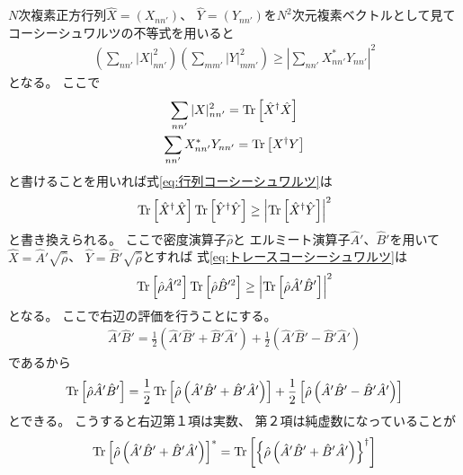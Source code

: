 \documentclass[a4paper, 10pt, uplatex]{jsarticle}
\begin{document}
\begin{problem}
	$N$次複素正方行列$\hat{X} = (X_{nn'})$、
	$\hat{Y} = (Y_{nn'})$を$N^2$次元複素ベクトルとして見て
	コーシーシュワルツの不等式を用いると
	\begin{align}
		\left( \sum_{nn'} |X|^2_{nn'} \right)
		\left( \sum_{mm'} |Y|^2_{mm'} \right)
		\geq \left| \sum_{nn'} X^*_{nn'} Y_{nn'} \right|^2
		\label{eq:行列コーシーシュワルツ}
	\end{align}
	となる。
	ここで
	\begin{gather}
		\sum_{nn'} |X|^2_{nn'}
		= \operatorname*{Tr} \left[ \hat{X}^\dagger \hat{X} \right] \\
		\sum_{nn'} X^*_{nn'} Y_{nn'}
		= \operatorname*{Tr} \left[ X^\dagger Y \right]
	\end{gather}
	と書けることを用いれば式\eqref{eq:行列コーシーシュワルツ}は
	\begin{align}
		\operatorname*{Tr} \left[ \hat{X}^\dagger \hat{X} \right]
		\operatorname*{Tr} \left[ \hat{Y}^\dagger \hat{Y} \right]
		\geq \left| \operatorname*{Tr} \left[ \hat{X}^\dagger \hat{Y} \right] \right|^2
		\label{eq:トレースコーシーシュワルツ}
	\end{align}
	と書き換えられる。
	ここで密度演算子$\hat{\rho}$と
	エルミート演算子$\hat{A}'$、$\hat{B}'$を用いて
	$\hat{X} = \hat{A}' \sqrt{\hat{\rho}}$、
	$\hat{Y} = \hat{B}' \sqrt{\hat{\rho}}$とすれば
	式\eqref{eq:トレースコーシーシュワルツ}は
	\begin{align}
		\operatorname*{Tr} \left[ \hat{\rho} \hat{A}'^2 \right]
		\operatorname*{Tr} \left[ \hat{\rho} \hat{B}'^2 \right]
		\geq \left| \operatorname*{Tr} \left[ \hat{\rho} \hat{A}' \hat{B}' \right] \right|^2
	\end{align}
	となる。
	ここで右辺の評価を行うことにする。
	\begin{align}
		\hat{A}' \hat{B}'
		= \frac{1}{2} \left( \hat{A}' \hat{B}' + \hat{B}' \hat{A}' \right)
		+ \frac{1}{2} \left( \hat{A}' \hat{B}' - \hat{B}' \hat{A}' \right)
	\end{align}
	であるから
	\begin{align}
		\operatorname*{Tr} \left[ \hat{\rho} \hat{A}' \hat{B}' \right]
		= \frac{1}{2} \operatorname*{Tr} \left[ \hat{\rho}
		\left( \hat{A}' \hat{B}' + \hat{B}' \hat{A}' \right) \right]
		+ \frac{1}{2} \left[ \hat{\rho}
		\left( \hat{A}' \hat{B}' - \hat{B}' \hat{A}' \right) \right]
	\end{align}
	とできる。
	こうすると右辺第１項は実数、
	第２項は純虚数になっていることが
	\begin{align}
		\Tr \left[ \hat{\rho} 
		\left( \hat{A}' \hat{B}' + \hat{B}' \hat{A}' \right) \right]^*
		&= \Tr \left[ \left\{ \hat{\rho} \left( \hat{A}' \hat{B}'
		+ \hat{B}' \hat{A}' \right) \right\}^\dagger \right] \\

\end{align}
\end{problem}
\end{document}
